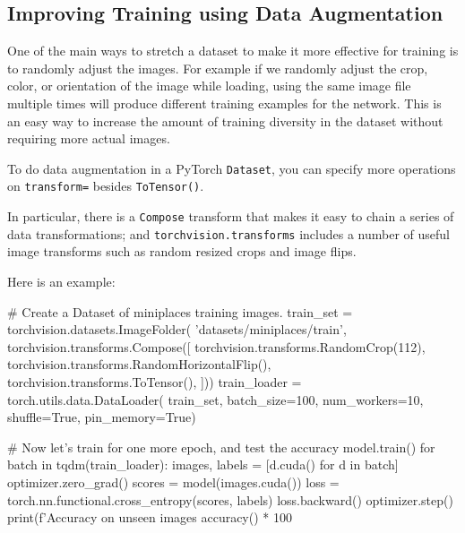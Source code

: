 \subsection{Improving Training using Data Augmentation}

One of the main ways to stretch a dataset to make it more effective for training is to randomly adjust the images. For example if we randomly adjust the crop, color, or orientation of the image while loading, using the same image file  multiple times will produce different training examples for the network. This is an easy way to increase the amount of training diversity in the dataset without requiring more actual images. 

To do data augmentation in a PyTorch \texttt{Dataset}, you can specify more operations on \texttt{transform=} besides \texttt{ToTensor()}. 

In particular, there is a \texttt{Compose} transform that makes it easy to chain a series of data transformations; and \texttt{torchvision.transforms} includes a number of useful image transforms such as random resized crops and image flips. 

Here is an example:

\begin{codeblock}[language=python]
# Create a Dataset of miniplaces training images.
train_set = torchvision.datasets.ImageFolder(
    'datasets/miniplaces/train',
    torchvision.transforms.Compose([
        torchvision.transforms.RandomCrop(112),
        torchvision.transforms.RandomHorizontalFlip(),
        torchvision.transforms.ToTensor(),
    ]))
train_loader = torch.utils.data.DataLoader(
    train_set, batch_size=100, num_workers=10,
    shuffle=True,
    pin_memory=True)

# Now let's train for one more epoch, and test the accuracy
model.train()
for batch in tqdm(train_loader):
    images, labels = [d.cuda() for d in batch]
    optimizer.zero_grad()
    scores = model(images.cuda())
    loss = torch.nn.functional.cross_entropy(scores, labels)
    loss.backward()
    optimizer.step()
print(f'Accuracy on unseen images {accuracy() * 100}%
\end{codeblock}